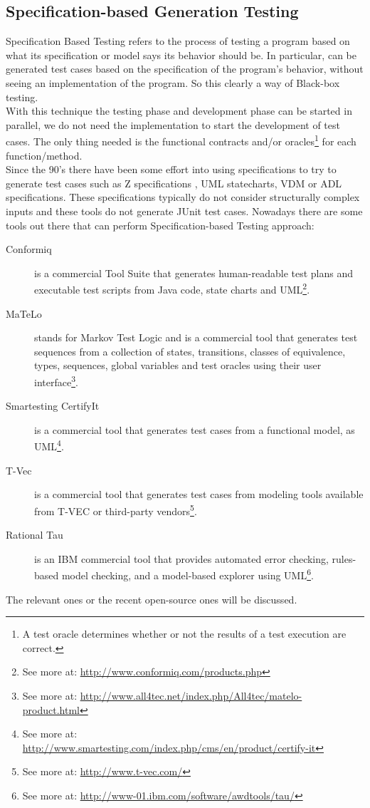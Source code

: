 \subsection{Specification-based Generation Testing}
Specification Based Testing refers to the process of testing a program based on what its specification or model says its behavior should be.
In particular, can be generated test cases based on the specification of the program's behavior, without seeing an implementation of the program. So this clearly a
way of Black-box testing.\\
With this technique the testing phase and development phase can be started in parallel, we do not need the implementation
to start the development of test cases. The only thing needed is the functional contracts and/or oracles\footnote{A test oracle determines whether or not the results of a test execution are correct\cite{Peters95generatinga}.} for each function/method.\\
Since the 90's there have been some effort into using specifications to try to generate test cases such as Z specifications
\cite{Horcher95improvingsoftware,Stocks:1996:FST:239916.239918}, \ac{UML} statecharts\cite{Offutt:1999:GTU:1767297.1767341}, \ac{VDM}\cite{Aichernig99automatedblack-box}
or \ac{ADL} specifications\cite{Sankar94specifyingand}.
These specifications typically do not consider structurally complex inputs and these tools do not generate JUnit test cases.
Nowadays there are some tools out there that can perform Specification-based Testing approach:

\begin{description}
\item[Conformiq] is a commercial Tool Suite that generates
human-readable test plans and executable test scripts from Java code, state charts and \ac{UML}\footnote{See more at: \url{http://www.conformiq.com/products.php}}.
\item[MaTeLo] stands for Markov Test Logic and is a commercial tool
that generates test sequences from a collection of states, transitions, classes of equivalence, types, sequences, global variables and test oracles
using their user interface\footnote{See more at: \url{http://www.all4tec.net/index.php/All4tec/matelo-product.html}}.
\item[Smartesting CertifyIt] is a commercial tool that generates test cases from a functional model, as \ac{UML}\footnote{See more at: \url{http://www.smartesting.com/index.php/cms/en/product/certify-it}}.
\item[T-Vec] is a commercial tool that generates test cases from modeling tools available from T-VEC or third-party vendors\footnote{See more at: \url{http://www.t-vec.com/}}.
\item[Rational Tau] is an \ac{IBM} commercial tool that provides automated error checking, rules-based model checking, and a model-based explorer using
\ac{UML}\footnote{See more at: \url{http://www-01.ibm.com/software/awdtools/tau/}}.
\end{description}
The relevant ones or the recent open-source ones will be discussed.

